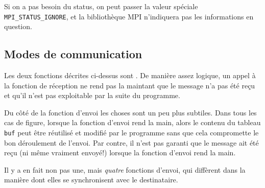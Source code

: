 Si on a pas besoin du status, on peut passer la valeur spéciale
\texttt{MPI\_STATUS\_IGNORE}, et la bibliothèque MPI n'indiquera pas les
informations en question.

\subsection{Modes de communication}

Les deux fonctions décrites ci-dessus sont . De
manière assez logique, un appel à la fonction de réception ne \og rend
pas la main\fg tant que le message n'a pas été reçu et qu'il n'est pas
exploitable par la suite du programme.

Du côté de la fonction d'envoi les choses sont un peu plus subtiles. Dans tous
les cas de figure, lorsque la fonction d'envoi rend la main, alors le contenu du
tableau \verb|buf| peut être réutilisé et modifié par le programme sans que cela
compromette le bon déroulement de l'envoi. Par contre, il n'est pas garanti que
le message ait été reçu (ni même \og vraiment envoyé\fg !) lorsque la fonction
d'envoi rend la main.

Il y a en fait non pas une, mais \emph{quatre} fonctions d'envoi, qui
diffèrent dans la manière dont elles se synchronisent avec le
destinataire.

